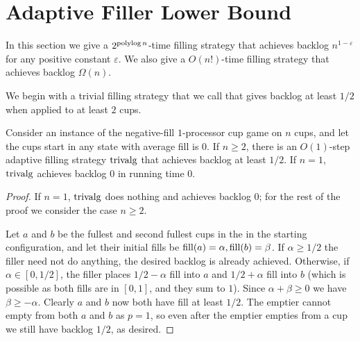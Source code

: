 \section{Adaptive Filler Lower Bound}\label{sec:adaptive}

In this section we give a $2^{\operatorname{\text{polylog}} n}$-time filling strategy
that achieves backlog $n^{1 - \varepsilon}$ for any positive
constant $\varepsilon$. 
We also give a $O(n!)$-time filling strategy that achieves
backlog $\Omega(n)$.

We begin with a trivial filling strategy that we call
 that gives backlog at least $1/2$ when applied
to at least $2$ cups.
\begin{proposition}
  \label{prop:adaptiveBase}
  Consider an instance of the negative-fill $1$-processor cup
  game on $n$ cups, and let the cups start in any state with
  average fill is $0$. If $n\ge 2$, there is an $O(1)$-step
  adaptive filling strategy $\operatorname{\text{\textup{trivalg}}}$ that achieves backlog at
  least $1/2$. If $n=1$, $\operatorname{\text{\textup{trivalg}}}$ achieves backlog $0$ in
  running time $0$.
\end{proposition}
\begin{proof}
  If $n=1$, $\operatorname{\text{\textup{trivalg}}}$ does nothing and achieves backlog $0$; for
  the rest of the proof we consider the case $n\ge 2$.

  Let $a$ and $b$ be the fullest and second fullest cups in the in
  the starting configuration, and let their initial fills be
  $\operatorname{\text{\textup{fill}}}(a) = \alpha, \operatorname{\text{\textup{fill}}}(b) = \beta$. 
  If $\alpha\ge 1/2$ the filler need not do anything, the desired
  backlog is already achieved.
  Otherwise, if $\alpha \in [0, 1/2]$, the filler places
  $1/2-\alpha$ fill into $a$ and $1/2 + \alpha$ fill into $b$
  (which is possible as both fills are in $[0,1]$, and they sum
  to $1$). Since $\alpha + \beta \ge 0$ we have $\beta \ge -\alpha$.
  Clearly $a$ and $b$ now both have fill at least $1/2$.
  The emptier cannot empty from both $a$ and $b$ as $p=1$, so
  even after the emptier empties from a cup we still have backlog
  $1/2$, as desired.
\end{proof}

  
